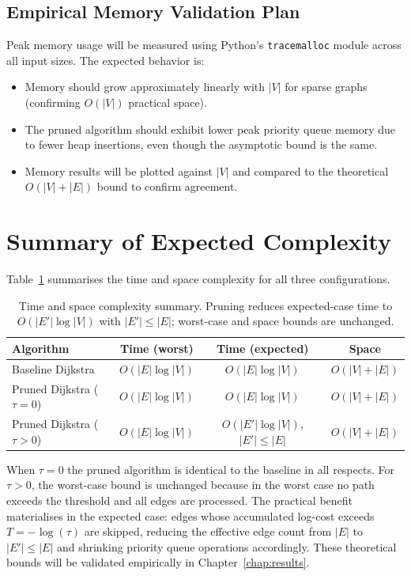 \subsection{Empirical Memory Validation Plan}

Peak memory usage will be measured using Python's \texttt{tracemalloc} module across all input sizes. The expected behavior is:
\begin{itemize}
    \item Memory should grow approximately linearly with $|V|$ for sparse graphs (confirming $O(|V|)$ practical space).
    \item The pruned algorithm should exhibit lower peak priority queue memory due to fewer heap insertions, even though the asymptotic bound is the same.
    \item Memory results will be plotted against $|V|$ and compared to the theoretical $O(|V|+|E|)$ bound to confirm agreement.
\end{itemize}

\section{Summary of Expected Complexity}

Table~\ref{table:complexity_summary} summarises the time and space complexity for all three configurations.

\begin{table}[h!]
\centering
\renewcommand{\arraystretch}{1.4}
\begin{tabular}{@{}lccc@{}}
\toprule
\textbf{Algorithm} & \textbf{Time (worst)} & \textbf{Time (expected)} & \textbf{Space} \\
\midrule
Baseline Dijkstra & $O(|E|\log|V|)$ & $O(|E|\log|V|)$ & $O(|V|+|E|)$ \\
Pruned Dijkstra ($\tau=0$) & $O(|E|\log|V|)$ & $O(|E|\log|V|)$ & $O(|V|+|E|)$ \\
Pruned Dijkstra ($\tau>0$) & $O(|E|\log|V|)$ & $O(|E'|\log|V|)$, $|E'|\leq|E|$ & $O(|V|+|E|)$ \\
\bottomrule
\end{tabular}
\caption[Complexity summary]{Time and space complexity summary. Pruning reduces expected-case time to $O(|E'|\log|V|)$ with $|E'|\leq|E|$; worst-case and space bounds are unchanged.}
\label{table:complexity_summary}
\end{table}

When $\tau=0$ the pruned algorithm is identical to the baseline in all respects. For $\tau>0$, the worst-case bound is unchanged because in the worst case no path exceeds the threshold and all edges are processed. The practical benefit materialises in the expected case: edges whose accumulated log-cost exceeds $T=-\log(\tau)$ are skipped, reducing the effective edge count from $|E|$ to $|E'|\leq|E|$ and shrinking priority queue operations accordingly. These theoretical bounds will be validated empirically in Chapter~\ref{chap:results}.

